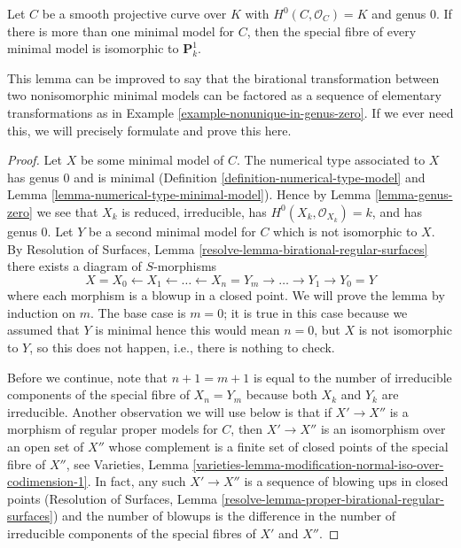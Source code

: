 \begin{lemma}
\label{lemma-nonuniqueness}
Let $C$ be a smooth projective curve over $K$ with $H^0(C, \mathcal{O}_C) = K$
and genus $0$. If there is more than one minimal model for $C$, then
the special fibre of every minimal model is isomorphic to $\mathbf{P}^1_k$.
\end{lemma}

\noindent
This lemma can be improved to say that the birational transformation
between two nonisomorphic minimal models can be factored as a sequence of
elementary transformations as in Example \ref{example-nonunique-in-genus-zero}.
If we ever need this, we will precisely formulate and prove this here.

\begin{proof}
Let $X$ be some minimal model of $C$. The numerical type associated to $X$
has genus $0$ and is minimal (Definition \ref{definition-numerical-type-model}
and Lemma \ref{lemma-numerical-type-minimal-model}).
Hence by Lemma \ref{lemma-genus-zero} we see that
$X_k$ is reduced, irreducible, has $H^0(X_k, \mathcal{O}_{X_k}) = k$,
and has genus $0$. Let $Y$ be a second minimal model for $C$
which is not isomorphic to $X$. By
Resolution of Surfaces, Lemma \ref{resolve-lemma-birational-regular-surfaces}
there exists a diagram of $S$-morphisms
$$
X = X_0 \leftarrow X_1 \leftarrow \ldots \leftarrow X_n = Y_m
\to \ldots \to Y_1 \to Y_0 = Y
$$
where each morphism is a blowup in a closed point. We will prove the
lemma by induction on $m$. The base case is $m = 0$; it is
true in this case because we assumed that $Y$ is minimal
hence this would mean $n = 0$, but $X$ is not isomorphic
to $Y$, so this does not happen, i.e., there is nothing to check.

\medskip\noindent
Before we continue, note that $n + 1 = m + 1$ is equal to the number of
irreducible components of the special fibre of $X_n = Y_m$ because
both $X_k$ and $Y_k$ are irreducible. Another observation we
will use below is that if $X' \to X''$ is a morphism
of regular proper models for $C$, then $X' \to X''$ is an isomorphism
over an open set of $X''$ whose complement is a finite set
of closed points of the special fibre of $X''$, see
Varieties, Lemma
\ref{varieties-lemma-modification-normal-iso-over-codimension-1}.
In fact, any such $X' \to X''$ is a sequence
of blowing ups in closed points (Resolution of Surfaces, Lemma
\ref{resolve-lemma-proper-birational-regular-surfaces}) and the
number of blowups is the difference in the number of irreducible
components of the special fibres of $X'$ and $X''$.


\end{proof}
